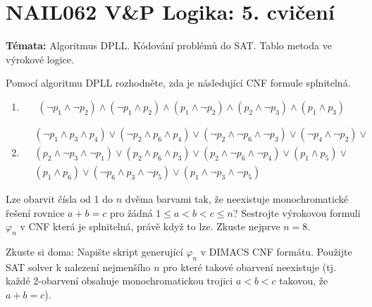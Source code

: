 \documentclass[a4paper,12pt]{article}
\begin{document}
\section*{NAIL062 V\&P Logika: 5. cvičení}


\textbf{Témata:} 
Algoritmus DPLL. Kódování problémů do SAT. Tablo metoda ve výrokové logice. 


\medskip\begin{problem}
    Pomocí algoritmu DPLL rozhodněte, zda je následující CNF formule splnitelná.
    \begin{enumerate}
        \item $$ (\neg p_1 \wedge \neg p_2)\land( \neg p_1 \wedge p_2)\land( p_1 \wedge \neg p_2)\land( p_2 \wedge \neg p_3)\land( p_1 \wedge p_3)$$
        \item \begin{align*}
            &(\neg p_1 \wedge p_3 \wedge p_4)\vee( \neg p_2 \wedge p_6 \wedge p_4)\vee( \neg p_2 \wedge \neg p_6 \wedge \neg p_3)\vee(
                \neg p_4 \wedge \neg p_2)\vee \\ & ( p_2 \wedge \neg p_3 \wedge \neg p_1)\vee ( p_2 \wedge p_6 \wedge p_3)\vee
                ( p_2 \wedge \neg p_6 \wedge \neg p_4)\vee
                ( p_1 \wedge p_5)\vee \\ & ( p_1 \wedge p_6)\vee(
                \neg p_6 \wedge p_3 \wedge \neg p_5)\vee( p_1 \wedge \neg p_3 \wedge \neg p_5)    
        \end{align*}
    \end{enumerate}
\end{problem}


        
        
    \medskip\begin{problem}
        Lze obarvit čísla od 1 do $n$ dvěma barvami tak, že neexistuje monochromatické řešení rovnice
        $a+b=c$ pro žádná $1\leq a<b<c\leq n$? Sestrojte výrokovou formuli $\varphi_n$ v CNF která je splnitelná, právě když to lze. Zkuste nejprve $n=8$.
        
        Zkuste si doma: Napište skript generující $\varphi_n$ v DIMACS CNF formátu. Použijte SAT solver k nalezení nejmenšího $n$ pro které takové obarvení neexistuje (tj. každé 2-obarvení obsahuje monochromatickou trojici $a<b<c$ takovou, že $a+b=c$).
    \end{problem}
    
\end{document}
